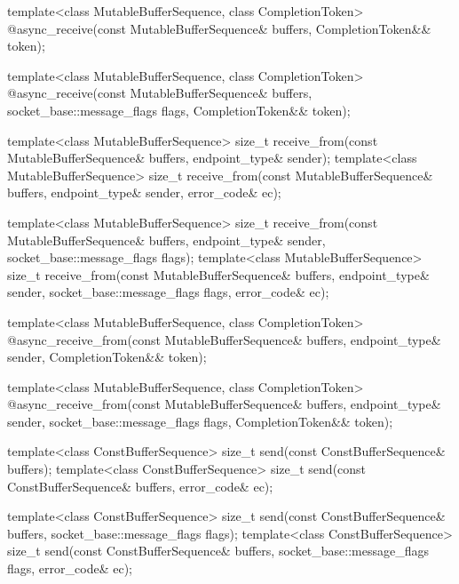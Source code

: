 \begin{codeblock}
{{{{{    template<class MutableBufferSequence, class CompletionToken>
      @\DEDUCED@ async_receive(const MutableBufferSequence& buffers,
                            CompletionToken&& token);

    template<class MutableBufferSequence, class CompletionToken>
      @\DEDUCED@ async_receive(const MutableBufferSequence& buffers,
                            socket_base::message_flags flags,
                            CompletionToken&& token);

    template<class MutableBufferSequence>
      size_t receive_from(const MutableBufferSequence& buffers,
                          endpoint_type& sender);
    template<class MutableBufferSequence>
      size_t receive_from(const MutableBufferSequence& buffers,
                          endpoint_type& sender, error_code& ec);

    template<class MutableBufferSequence>
      size_t receive_from(const MutableBufferSequence& buffers,
                          endpoint_type& sender,
                          socket_base::message_flags flags);
    template<class MutableBufferSequence>
      size_t receive_from(const MutableBufferSequence& buffers,
                          endpoint_type& sender,
                          socket_base::message_flags flags,
                          error_code& ec);

    template<class MutableBufferSequence, class CompletionToken>
      @\DEDUCED@ async_receive_from(const MutableBufferSequence& buffers,
                                 endpoint_type& sender,
                                 CompletionToken&& token);

    template<class MutableBufferSequence, class CompletionToken>
      @\DEDUCED@ async_receive_from(const MutableBufferSequence& buffers,
                                 endpoint_type& sender,
                                 socket_base::message_flags flags,
                                 CompletionToken&& token);

    template<class ConstBufferSequence>
      size_t send(const ConstBufferSequence& buffers);
    template<class ConstBufferSequence>
      size_t send(const ConstBufferSequence& buffers, error_code& ec);

    template<class ConstBufferSequence>
      size_t send(const ConstBufferSequence& buffers,
                  socket_base::message_flags flags);
    template<class ConstBufferSequence>
      size_t send(const ConstBufferSequence& buffers,
                  socket_base::message_flags flags, error_code& ec);

}}}}}
\end{codeblock}
